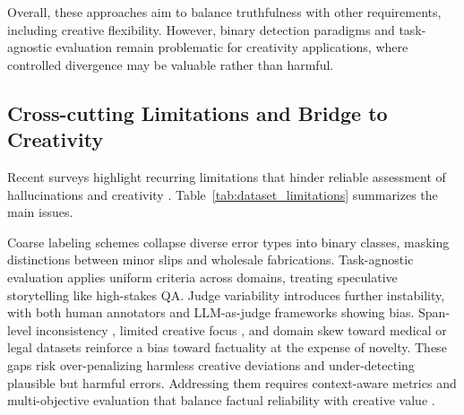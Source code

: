 \documentclass{llncs}
\begin{document}
Overall, these approaches aim to balance truthfulness with other requirements, including creative flexibility. However, binary detection paradigms and task-agnostic evaluation remain problematic for creativity applications, where controlled divergence may be valuable rather than harmful.


\subsection{Cross-cutting Limitations and Bridge to Creativity}

Recent surveys highlight recurring limitations that hinder reliable assessment of hallucinations and creativity \cite{huang2025survey,ji2023hallucination,jiang2024survey}. Table~\ref{tab:dataset_limitations} summarizes the main issues. 

Coarse labeling schemes \cite{li2023halueval,thorne2018fever,lin2022truthfulqa,cheng2023haluqa} collapse diverse error types into binary classes, masking distinctions between minor slips and wholesale fabrications. Task-agnostic evaluation \cite{mallen2023popqa,wei2024shortformfactuality} applies uniform criteria across domains, treating speculative storytelling like high-stakes QA. Judge variability \cite{bang2025hallulens,marco2025reader} introduces further instability, with both human annotators and LLM-as-judge frameworks showing bias. Span-level inconsistency \cite{pagnoni2021frank,cheng2023haluqa}, limited creative focus \cite{franceschelli2024creativity,ismayilzada2025evaluating}, and domain skew toward medical or legal datasets reinforce a bias toward factuality at the expense of novelty. These gaps risk over-penalizing harmless creative deviations and under-detecting plausible but harmful errors. Addressing them requires context-aware metrics and multi-objective evaluation that balance factual reliability with creative value \cite{cyriac2025metrics,li2025automated}.
\end{document}
